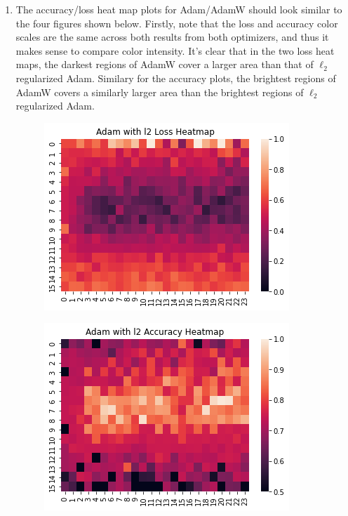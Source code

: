 \begin{enumerate}[(a)]
{\begin{enumerate}
    \item{
    The accuracy/loss heat map plots for Adam/AdamW should look similar to the four figures shown below. Firstly, note that the loss and accuracy color scales are the same across both results from both optimizers, and thus it makes sense to compare color intensity. It's clear that in the two loss heat maps, the darkest regions of AdamW cover a larger area than that of $\ell_2$ regularized Adam. Similary for the accuracy plots, the brightest regions of AdamW covers a similarly larger area than the brightest regions of $\ell_2$ regularized Adam.
    \\
    \begin{minipage}{0.5 \textwidth}
        \begin{figure}[H]
            \centering
            \includegraphics[scale=0.65]{graphs/adam_loss.png}
            \label{InVsOutputLen}
        \end{figure}
    \end{minipage}
    \begin{minipage}{0.5 \textwidth}
        \begin{figure}[H]
            \centering
            \includegraphics[scale=0.65]{graphs/adam_accuracy.png}
            \label{InLenVsRunTime}
        \end{figure}
    \end{minipage}

}
\end{enumerate}}
\end{enumerate}
